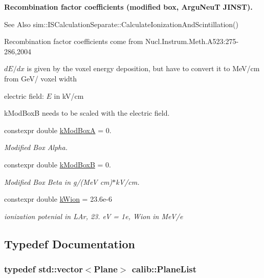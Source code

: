 \begin{Indent}{\bf Recombination factor coefficients (modified box, Argu\-Neu\-T J\-I\-N\-S\-T).}\par
{\em \begin{DoxySeeAlso}{See Also}
sim\-::\-I\-S\-Calculation\-Separate\-::\-Calculate\-Ionization\-And\-Scintillation()
\end{DoxySeeAlso}
Recombination factor coefficients come from Nucl.\-Instrum.\-Meth.\-A523\-:275-\/286,2004
\begin{DoxyItemize}
\item $ dE/dx $ is given by the voxel energy deposition, but have to convert it to Me\-V/cm from Ge\-V/ voxel width
\item electric field\-: $ E $ in k\-V/cm
\item {\ttfamily k\-Mod\-Box\-B} needs to be scaled with the electric field. 
\end{DoxyItemize}}\begin{DoxyCompactItemize}
\item 
constexpr double \hyperlink{namespacecalib_a16e735162e8ea0d3353c964b4a262820}{k\-Mod\-Box\-A} = 0.
\begin{DoxyCompactList}\small\item\em Modified Box Alpha. \end{DoxyCompactList}\item 
constexpr double \hyperlink{namespacecalib_a72195815709970d1ebc8c4e1f3f9ee69}{k\-Mod\-Box\-B} = 0.
\begin{DoxyCompactList}\small\item\em Modified Box Beta in g/(Me\-V cm)$\ast$k\-V/cm. \end{DoxyCompactList}\item 
constexpr double \hyperlink{namespacecalib_aba19df99e169a2fe2382757e26216f88}{k\-Wion} = 23.\-6e-\/6
\begin{DoxyCompactList}\small\item\em ionization potenial in L\-Ar, 23. e\-V = 1e, Wion in Me\-V/e \end{DoxyCompactList}\end{DoxyCompactItemize}
\end{Indent}


\subsection{Typedef Documentation}
\hypertarget{namespacecalib_a007f645ec5958ddca8582afe498adc1c}{
\subsubsection[{Plane\-List}]{\setlength{\rightskip}{0pt plus 5cm}typedef std\-::vector$<${\bf Plane}$>$ {\bf calib\-::\-Plane\-List}}}\label{namespacecalib_a007f645ec5958ddca8582afe498adc1c}


